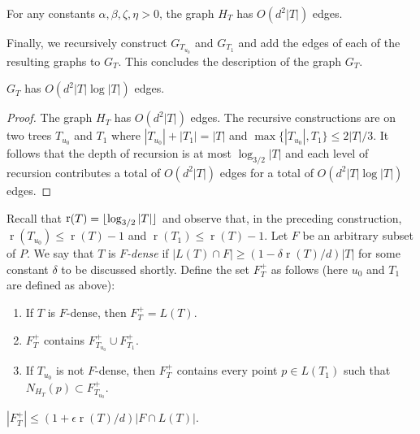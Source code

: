 \documentclass{patmorin}
\DeclareMathOperator{\rank}{r}
\begin{document}
\begin{clm}
	For any constants $\alpha,\beta,\zeta,\eta>0$, the graph $H_T$ has 
	$O(d^2|T|)$ edges.
\end{clm}

Finally, we recursively construct $G_{T_{u_0}}$ and $G_{T_1}$ and add the
edges of each of the resulting graphs to $G_{T}$. This concludes the description of the graph $G_T$.

\begin{clm}
  $G_{T}$ has $O(d^2|T|\log |T|)$ edges.
\end{clm}

\begin{proof}
  The graph $H_T$ has
  $O(d^2|T|)$ edges.  The recursive constructions are on two trees $T_{u_0}$
  and $T_1$ where $|T_{u_0}|+|T_1|=|T|$ and $\max\{|T_{u_0}|,T_1\}\le
  2|T|/3$. It follows that the depth of recursion is at most
  $\log_{3/2}|T|$ and each level of recursion contributes a total of
  $O(d^2|T|)$ edges for a total of $O(d^2|T|\log|T|)$ edges.
\end{proof}

Recall that $\rank(T)=\floor{\log_{3/2} |T|}$ and observe that, in
the preceding construction, $\rank(T_{u_0}) \le \rank(T)-1$ and
$\rank(T_1)\le\rank(T)-1$.  Let $F$ be an arbitrary subset of $P$.  We say
that $T$ is \emph{$F$-dense} if $|L(T)\cap F|\ge (1-\delta\rank(T)/d)|T|$
for some constant $\delta$ to be discussed shortly.  Define the set
$F^+_T$ as follows (here $u_0$ and $T_1$ are defined as above):

\begin{enumerate}
  \item If $T$ is $F$-dense, then $F^+_T=L(T)$.
  \item $F^+_T$ contains $F^+_{T_{u_0}}\cup F^+_{T_1}$.
  \item If $T_{u_0}$ is not $F$-dense, then $F^+_T$ contains every point $p\in L(T_1)$ such that $N_{H_T}(p)\subset F^+_{T_{u_0}}$.
\end{enumerate}


\begin{clm}
	$|F^+_T| \le (1+\epsilon\rank(T)/d)|F\cap L(T)|$.
\end{clm}
\end{document}

